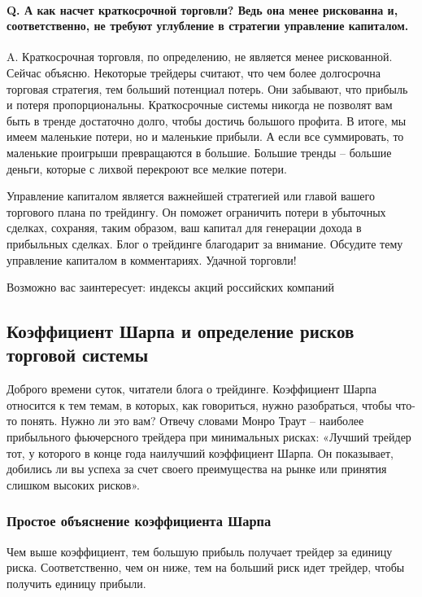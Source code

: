 \documentclass[a5paper]{article}
\begin{document}
\paragraph{Q. А как насчет краткосрочной торговли? Ведь она менее рискованна и, соответственно, не требуют углубление в стратегии управление капиталом.}

A. Краткосрочная торговля, по определению, не является менее рискованной. Сейчас объясню. Некоторые трейдеры считают, что чем более долгосрочна торговая стратегия, тем больший потенциал потерь. Они забывают, что прибыль и потеря пропорциональны. Краткосрочные системы никогда не позволят вам быть в тренде достаточно долго, чтобы достичь большого профита. В итоге, мы имеем маленькие потери, но и маленькие прибыли. А если все суммировать, то маленькие проигрыши превращаются в большие. Большие тренды – большие деньги, которые с лихвой перекроют все мелкие потери.

Управление капиталом является важнейшей стратегией или главой вашего торгового плана по трейдингу. Он поможет ограничить потери в убыточных сделках, сохраняя, таким образом, ваш капитал для генерации дохода в прибыльных сделках. Блог о трейдинге благодарит за внимание. Обсудите тему управление капиталом в комментариях. Удачной торговли!


Возможно вас заинтересует: индексы акций российских компаний

\subsection{Коэффициент Шарпа и определение рисков торговой системы}

Доброго времени суток, читатели блога о трейдинге. Коэффициент Шарпа
относится к тем темам, в которых, как говориться, нужно разобраться,
чтобы что-то понять. Нужно ли это вам? Отвечу словами Монро Траут –
наиболее прибыльного фьючерсного трейдера при минимальных рисках:
«Лучший трейдер тот, у которого в конце года наилучший коэффициент
Шарпа. Он показывает, добились ли вы успеха за счет своего
преимущества на рынке или принятия слишком высоких рисков».

\subsubsection{Простое объяснение коэффициента Шарпа}

Чем выше коэффициент, тем большую прибыль получает трейдер за единицу риска. Соответственно, чем он ниже, тем на больший риск идет трейдер, чтобы получить единицу прибыли.
\end{document}
